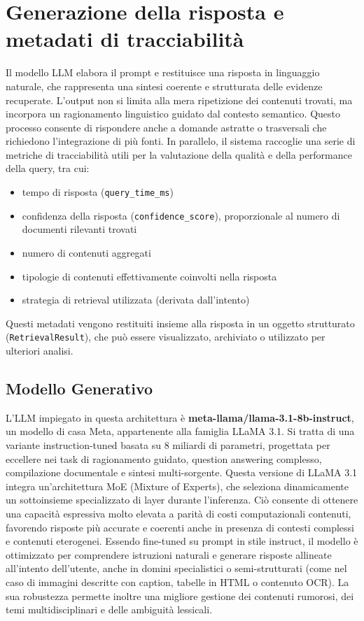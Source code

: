 \section{Generazione della risposta e metadati di tracciabilità}
Il modello LLM elabora il prompt e restituisce una risposta in linguaggio naturale, che rappresenta una sintesi coerente e strutturata delle evidenze recuperate. L’output non si limita alla mera ripetizione dei contenuti trovati, ma incorpora un ragionamento linguistico guidato dal contesto semantico. Questo processo consente di rispondere anche a domande astratte o trasversali che richiedono l’integrazione di più fonti.
In parallelo, il sistema raccoglie una serie di metriche di tracciabilità utili per la valutazione della qualità e della performance della query, tra cui:
\begin{itemize}
    \item tempo di risposta (\verb|query_time_ms|)
    \item confidenza della risposta (\verb|confidence_score|), proporzionale al numero di documenti rilevanti trovati
    \item numero di contenuti aggregati
    \item tipologie di contenuti effettivamente coinvolti nella risposta
    \item strategia di retrieval utilizzata (derivata dall’intento)
\end{itemize}
Questi metadati vengono restituiti insieme alla risposta in un oggetto strutturato (\verb|RetrievalResult|), che può essere visualizzato, archiviato o utilizzato per ulteriori analisi.
\subsection{Modello Generativo}
L’LLM impiegato in questa architettura è \textbf{meta-llama/llama-3.1-8b-instruct}, un modello  di casa Meta, appartenente alla famiglia LLaMA 3.1. Si tratta di una variante instruction-tuned basata su 8 miliardi di parametri, progettata per eccellere nei task di ragionamento guidato, question answering complesso, compilazione documentale e sintesi multi-sorgente. Questa versione di LLaMA 3.1 integra un'architettura MoE (Mixture of Experts), che seleziona dinamicamente un sottoinsieme specializzato di layer durante l’inferenza. Ciò consente di ottenere una capacità espressiva molto elevata a parità di costi computazionali contenuti, favorendo risposte più accurate e coerenti anche in presenza di contesti complessi e contenuti eterogenei.
Essendo fine-tuned su prompt in stile instruct, il modello è ottimizzato per comprendere istruzioni naturali e generare risposte allineate all’intento dell’utente, anche in domini specialistici o semi-strutturati (come nel caso di immagini descritte con caption, tabelle in HTML o contenuto OCR). La sua robustezza permette inoltre una migliore gestione dei contenuti rumorosi, dei temi multidisciplinari e delle ambiguità lessicali.
